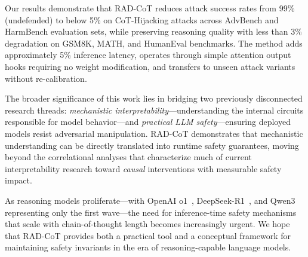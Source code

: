 \documentclass[11pt]{article}
\begin{document}
Our results demonstrate that RAD-CoT reduces attack success rates from 99\% (undefended) to below 5\% on CoT-Hijacking attacks across AdvBench and HarmBench evaluation sets, while preserving reasoning quality with less than 3\% degradation on GSM8K, MATH, and HumanEval benchmarks. The method adds approximately 5\% inference latency, operates through simple attention output hooks requiring no weight modification, and transfers to unseen attack variants without re-calibration.

The broader significance of this work lies in bridging two previously disconnected research threads: \emph{mechanistic interpretability}---understanding the internal circuits responsible for model behavior---and \emph{practical LLM safety}---ensuring deployed models resist adversarial manipulation. RAD-CoT demonstrates that mechanistic understanding can be directly translated into runtime safety guarantees, moving beyond the correlational analyses that characterize much of current interpretability research toward \emph{causal} interventions with measurable safety impact.

As reasoning models proliferate---with OpenAI o1~\citep{openai2024reasoning}, DeepSeek-R1~\citep{deepseek2025r1}, and Qwen3~\citep{qwen2025qwen3} representing only the first wave---the need for inference-time safety mechanisms that scale with chain-of-thought length becomes increasingly urgent. We hope that RAD-CoT provides both a practical tool and a conceptual framework for maintaining safety invariants in the era of reasoning-capable language models.


\end{document}
